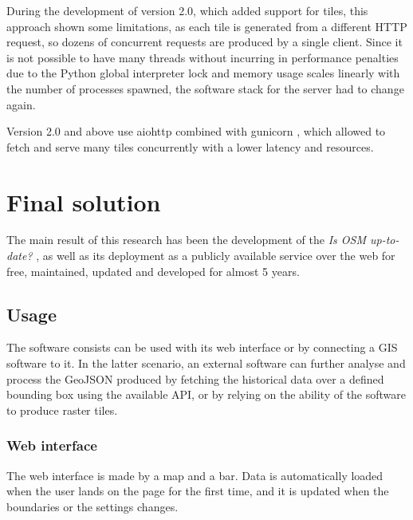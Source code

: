 \documentclass{Configuration_Files/PoliMi3i_thesis}
\begin{document}
During the development of version 2.0, which added support for tiles, this approach shown some limitations, as each tile is generated from a different HTTP request, so dozens of concurrent requests are produced by a single client. Since it is not possible to have many threads without incurring in performance penalties due to the Python global interpreter lock and memory usage scales linearly with the number of processes spawned, the software stack for the server had to change again.

Version 2.0 and above use aiohttp \cite{AsyncHttpClient2022} combined with gunicorn \cite{GunicornPythonWSGI}, which allowed to fetch and serve many tiles concurrently with a lower latency and resources.

\chapter{Final solution}
\label{ch:final_solution}%

The main result of this research has been the development of the \textit{Is OSM up-to-date?} \cite{OSMUptodate,frassinelliOSMUptodate2022}, as well as its deployment as a publicly available service over the web for free, maintained, updated and developed for almost 5 years.

\section{Usage}

The software consists can be used with its web interface or by connecting a GIS software to it. In the latter scenario, an external software can further analyse and process the GeoJSON produced by fetching the historical data over a defined bounding box using the available API, or by relying on the ability of the software to produce raster tiles.

\subsection{Web interface}

The web interface is made by a map and a bar. Data is automatically loaded when the user lands on the page for the first time, and it is updated when the boundaries or the settings changes.
\end{document}
